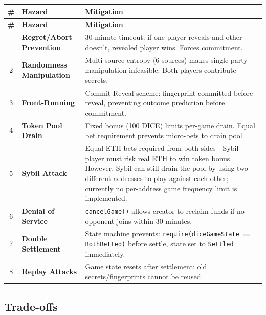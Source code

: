 \documentclass[10pt,a4paper]{article}
\begin{document}
\begin{longtable}{c p{3.5cm} p{7cm}}
\toprule
\textbf{\#} & \textbf{Hazard} & \textbf{Mitigation} \\
\midrule
\endfirsthead
\toprule
\textbf{\#} & \textbf{Hazard} & \textbf{Mitigation} \\
\midrule
\endhead
\bottomrule
\endfoot
1 & \textbf{Regret/Abort Prevention} & 30-minute timeout: if one player reveals and other doesn't, revealed player wins. Forces commitment. \\
2 & \textbf{Randomness Manipulation} & Multi-source entropy (6 sources) makes single-party manipulation infeasible. Both players contribute secrets. \\
3 & \textbf{Front-Running} & Commit-Reveal scheme: fingerprint committed before reveal, preventing outcome prediction before commitment. \\
4 & \textbf{Token Pool Drain} & Fixed bonus (100 DICE) limits per-game drain. Equal bet requirement prevents micro-bets to drain pool. \\
5 & \textbf{Sybil Attack} & Equal ETH bets required from both sides - Sybil player must risk real ETH to win token bonus. However, Sybil can still drain the pool by using two different addresses to play against each other; currently no per-address game frequency limit is implemented. \\
6 & \textbf{Denial of Service} & \texttt{cancelGame()} allows creator to reclaim funds if no opponent joins within 30 minutes. \\
7 & \textbf{Double Settlement} & State machine prevents: \texttt{require(diceGameState == BothBetted)} before settle, state set to \texttt{Settled} immediately. \\
8 & \textbf{Replay Attacks} & Game state resets after settlement; old secrets/fingerprints cannot be reused. \\
\bottomrule
\end{longtable}

\subsection*{Trade-offs}
\end{document}

